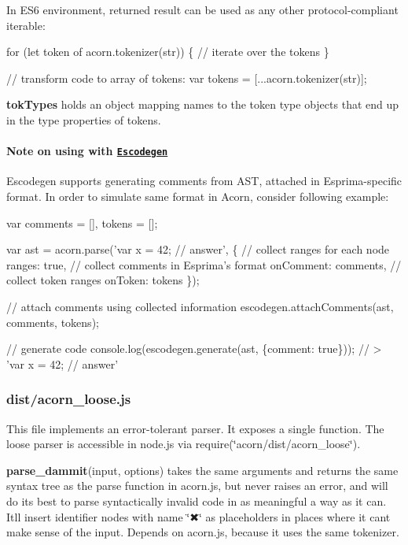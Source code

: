 In E\+S6 environment, returned result can be used as any other protocol-\/compliant iterable\+:


\begin{DoxyCode}
for (let token of acorn.tokenizer(str)) \{
  // iterate over the tokens
\}

// transform code to array of tokens:
var tokens = [...acorn.tokenizer(str)];
\end{DoxyCode}


{\bfseries tok\+Types} holds an object mapping names to the token type objects that end up in the {\ttfamily type} properties of tokens.

\paragraph*{Note on using with \href{https://github.com/estools/escodegen}{\tt Escodegen}}

Escodegen supports generating comments from A\+ST, attached in Esprima-\/specific format. In order to simulate same format in Acorn, consider following example\+:


\begin{DoxyCode}
var comments = [], tokens = [];

var ast = acorn.parse('var x = 42; // answer', \{
  // collect ranges for each node
  ranges: true,
  // collect comments in Esprima's format
  onComment: comments,
  // collect token ranges
  onToken: tokens
\});

// attach comments using collected information
escodegen.attachComments(ast, comments, tokens);

// generate code
console.log(escodegen.generate(ast, \{comment: true\}));
// > 'var x = 42;    // answer'
\end{DoxyCode}


\subsubsection*{dist/acorn\+\_\+loose.\+js}

This file implements an error-\/tolerant parser. It exposes a single function. The loose parser is accessible in node.\+js via {\ttfamily require(\char`\"{}acorn/dist/acorn\+\_\+loose\char`\"{})}.

{\bfseries parse\+\_\+dammit}{\ttfamily (input, options)} takes the same arguments and returns the same syntax tree as the {\ttfamily parse} function in {\ttfamily acorn.\+js}, but never raises an error, and will do its best to parse syntactically invalid code in as meaningful a way as it can. It\textquotesingle{}ll insert identifier nodes with name {\ttfamily \char`\"{}✖\char`\"{}} as placeholders in places where it can\textquotesingle{}t make sense of the input. Depends on {\ttfamily acorn.\+js}, because it uses the same tokenizer.

